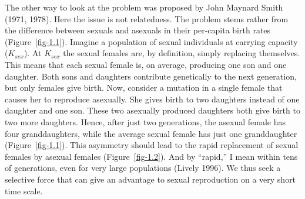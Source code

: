 \documentclass[
  letterpaper,
]{book}
\begin{document}
The other way to look at the problem was proposed by John Maynard Smith
(1971, 1978). Here the issue is not relatedness. The problem stems
rather from the difference between sexuals and asexuals in their
per-capita birth rates (Figure~\ref{fig-1.1}). Imagine a population of
sexual individuals at carrying capacity (\(K_{sex}\)). At \(K_{sex}\)
the sexual females are, by definition, simply replacing themselves. This
means that each sexual female is, on average, producing one son and one
daughter. Both sons and daughters contribute genetically to the next
generation, but only females give birth. Now, consider a mutation in a
single female that causes her to reproduce asexually. She gives birth to
two daughters instead of one daughter and one son. These two asexually
produced daughters both give birth to two more daughters. Hence, after
just two generations, the asexual female has four granddaughters, while
the average sexual female has just one granddaughter
(Figure~\ref{fig-1.1}). This asymmetry should lead to the rapid
replacement of sexual females by asexual females (Figure~\ref{fig-1.2}).
And by ``rapid,'' I mean within tens of generations, even for very large
populations (Lively 1996). We thus seek a selective force that can give
an advantage to sexual reproduction on a very short time scale.
\end{document}
